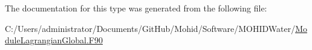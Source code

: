 The documentation for this type was generated from the following file\+:\begin{DoxyCompactItemize}
\item 
C\+:/\+Users/administrator/\+Documents/\+Git\+Hub/\+Mohid/\+Software/\+M\+O\+H\+I\+D\+Water/\mbox{\hyperlink{_module_lagrangian_global_8_f90}{Module\+Lagrangian\+Global.\+F90}}\end{DoxyCompactItemize}
